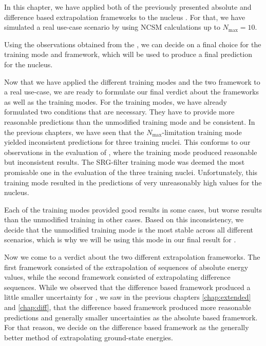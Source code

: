 In this chapter, we have applied both of the previously presented absolute and difference based extrapolation frameworks to the nucleus . For that, we have simulated a real use-case scenario by using NCSM calculations up to $N_\mathrm{max} = 10$.

Using the observations obtained from the , we can decide on a final choice for the training mode and framework, which will be used to produce a final prediction for the  nucleus.

Now that we have applied the different training modes and the two framework to a real use-case, we are ready to formulate our final verdict about the frameworks as well as the training modes. For the training modes, we have already formulated two conditions that are necessary. They have to provide more reasonable predictions than the unmodified training mode and be consistent. In the previous chapters, we have seen that the $N_\mathrm{max}$-limitation training mode yielded inconsistent predictions for three training nuclei. This conforms to our observations in the evaluation of , where the training mode produced reasonable but inconsistent results. The SRG-filter training mode was deemed the most promisable one in the evaluation of the three training nuclei. Unfortunately, this training mode resulted in the predictions of very unreasonably high values for the  nucleus.

Each of the training modes provided good results in some cases, but worse results than the unmodified training in other cases. Based on this inconsistency, we decide that the unmodified training mode is the most stable across all different scenarios, which is why we will be using this mode in our final result for .

Now we come to a verdict about the two different extrapolation frameworks. The first framework consisted of the extrapolation of sequences of absolute energy values, while the second framework consisted of extrapolating difference sequences. While we observed that the difference based framework produced a little smaller uncertainty for , we saw in the previous chapters \ref{chap:extended} and \ref{chap:diff}, that the difference based framework produced more reasonable predictions and generally smaller uncertainties as the absolute based framework. For that reason, we decide on the difference based framework as the generally better method of extrapolating ground-state energies.

